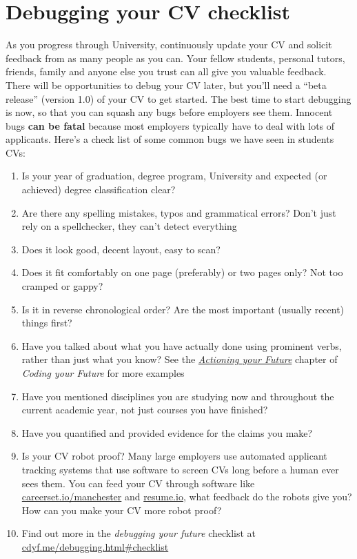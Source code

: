 \documentclass[
]{book}
\providecommand{\tightlist}{%
  \setlength{\itemsep}{0pt}\setlength{\parskip}{0pt}}
\begin{document}
\hypertarget{debugging-your-cv-checklist}{%
\section{Debugging your CV checklist}\label{debugging-your-cv-checklist}}

As you progress through University, continuously update your CV and solicit feedback from as many people as you can. Your fellow students, personal tutors, friends, family and anyone else you trust can all give you valuable feedback. There will be opportunities to debug your CV later, but you'll need a ``beta release'' (version 1.0) of your CV to get started. The best time to start debugging is now, so that you can squash any bugs before employers see them. Innocent bugs \textbf{can be fatal} because most employers typically have to deal with lots of applicants. Here's a check list of some common bugs we have seen in students CVs:

\begin{enumerate}
\def\labelenumi{\arabic{enumi}.}
\tightlist
\item
  Is your year of graduation, degree program, University and expected (or achieved) degree classification clear?
\item
  Are there any spelling mistakes, typos and grammatical errors? Don't just rely on a spellchecker, they can't detect everything
\item
  Does it look good, decent layout, easy to scan?
\item
  Does it fit comfortably on one page (preferably) or two pages only? Not too cramped or gappy?
\item
  Is it in reverse chronological order? Are the most important (usually recent) things first?
\item
  Have you talked about what you have actually done using prominent verbs, rather than just what you know? See the \emph{\href{https://www.cdyf.me/actioning.html}{Actioning your Future}} chapter of \emph{Coding your Future} for more examples
\item
  Have you mentioned disciplines you are studying now and throughout the current academic year, not just courses you have finished?
\item
  Have you quantified and provided evidence for the claims you make?
\item
  Is your CV robot proof? Many large employers use automated applicant tracking systems that use software to screen CVs long before a human ever sees them. You can feed your CV through software like \href{http://careerset.io/manchester}{careerset.io/manchester} and \href{https://resume.io/}{resume.io}, what feedback do the robots give you? How can you make your CV more robot proof?
\item
  Find out more in the \emph{debugging your future} checklist at \href{https://www.cdyf.me/debugging.html\#checklist}{cdyf.me/debugging.html\#checklist} \citep{debugyourfuture}
\end{enumerate}
\end{document}
